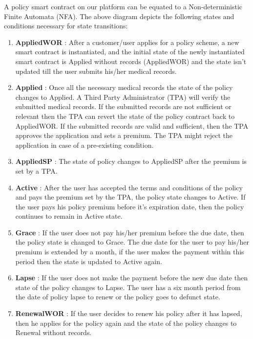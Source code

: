 A policy smart contract on our platform can be equated to a Non-deterministic Finite Automata (NFA). The above diagram depicts the following states and conditions necessary for state transitions:

\begin{enumerate}
    \item \textbf{AppliedWOR} : After a customer/user applies for a policy scheme, a new smart contract is instantiated, and the initial state of the newly instantiated smart contract is Applied without records (AppliedWOR) and the state isn’t updated till the user submits his/her medical records.
    
    \item \textbf{Applied} : Once all the necessary medical records the state of the policy changes to Applied. A Third Party Administrator (TPA) will verify the submitted medical records. If the submitted records are not sufficient or relevant then the TPA can revert the state of the policy contract back to AppliedWOR. If the submitted records are valid and sufficient, then the TPA approves the application and sets a premium. The TPA might reject the application in case of a pre-existing condition.
    
     \item  \textbf{AppliedSP} : The state of policy changes to AppliedSP after the premium is set by a TPA.

 \item  \textbf{Active} : After the user has accepted the terms and conditions of the policy and pays the premium set by the TPA, the policy state changes to Active. If the user pays his policy premium before it’s expiration date, then the policy continues to remain in Active state.

 \item \textbf{Grace} : If the user does not pay his/her premium before the due date, then the policy state is changed to Grace. The due date for the user to pay his/her premium is extended by a month, if the user makes the payment within this period then the state is updated to Active again.

 \item \textbf{Lapse} : If the user does not make the payment before the new due date then state of the policy changes to Lapse. The user has a six month period from the date of policy lapse to renew or the policy goes to defunct state.

 \item \textbf{RenewalWOR} : If the user decides to renew his policy after it has lapsed, then he applies for the policy again and the state of the policy changes to Renewal without records.


\end{enumerate}
